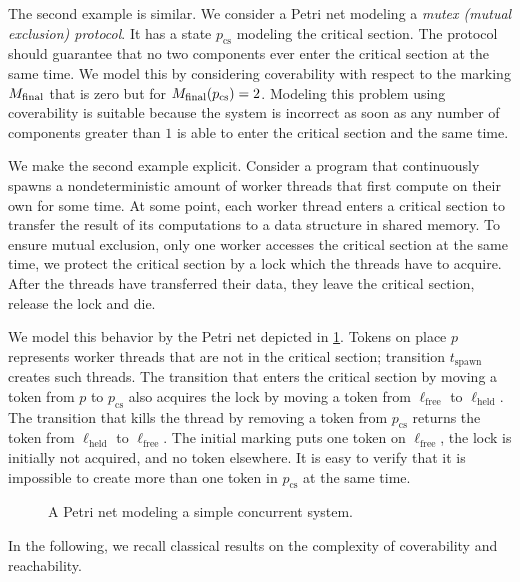 \documentclass[../../diss.tex]{subfiles}
\begin{document}
The second example is similar.
We consider a Petri net modeling a \emph{mutex (mutual exclusion) protocol}.
It has a state $p_{\text{cs}}$ modeling the critical section.
The protocol should guarantee that no two components ever enter the critical section at the same time.
We model this by considering coverability with respect to the marking $M_{\text{final}}$ that is zero but for $M_{\text{final}}(p_{\text{cs}}) = 2$.
Modeling this problem using coverability is suitable because the system is incorrect as soon as any number of components greater than $1$ is able to enter the critical section and the same time.

\begin{example}
    We make the second example explicit.
    Consider a program that continuously spawns a nondeterministic amount of worker threads that first compute on their own for some time.
    At some point, each worker thread enters a critical section to transfer the result of its computations to a data structure in shared memory.
    To ensure mutual exclusion, \ie only one worker accesses the critical section at the same time, we protect the critical section by a lock which the threads have to acquire.
    After the threads have transferred their data, they leave the critical section, release the lock and die.

    We model this behavior by the Petri net depicted in \cref{Figure:PNMutex}.
    Tokens on place $p$ represents worker threads that are not in the critical section; transition $t_{\text{spawn}}$ creates such threads.
    The transition that enters the critical section by moving a token from $p$ to $p_{\text{cs}}$ also acquires the lock by moving a token from $\ell_{\text{free}}$ to $\ell_{\text{held}}$.
    The transition that kills the thread by removing a token from $p_{\text{cs}}$ returns the token from $\ell_{\text{held}}$ to $\ell_{\text{free}}$.
    The initial marking puts one token on $\ell_{\text{free}}$, \ie the lock is initially not acquired, and no token elsewhere.
    It is easy to verify that it is impossible to create more than one token in $p_{\text{cs}}$ at the same time.
\end{example}

\begin{figure}
    \centering%
    \caption{A Petri net modeling a simple concurrent system.}%
    \label{Figure:PNMutex}%
\end{figure}

In the following, we recall classical results on the complexity of coverability and reachability.
\end{document}
